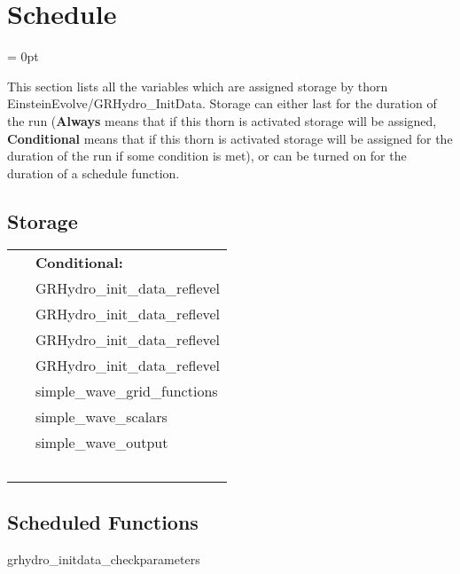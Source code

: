 
\section{Schedule} 


\parskip = 0pt


\noindent This section lists all the variables which are assigned storage by thorn EinsteinEvolve/GRHydro\_InitData.  Storage can either last for the duration of the run ({\bf Always} means that if this thorn is activated storage will be assigned, {\bf Conditional} means that if this thorn is activated storage will be assigned for the duration of the run if some condition is met), or can be turned on for the duration of a schedule function.


\subsection*{Storage}

\hspace{5mm}

 \begin{tabular*}{160mm}{ll} 
~& {\bf Conditional:} \\ 
~ &  GRHydro\_init\_data\_reflevel\\ 
~ &  GRHydro\_init\_data\_reflevel\\ 
~ &  GRHydro\_init\_data\_reflevel\\ 
~ &  GRHydro\_init\_data\_reflevel\\ 
~ &  simple\_wave\_grid\_functions\\ 
~ &  simple\_wave\_scalars\\ 
~ &  simple\_wave\_output\\ 
~ & ~\\ 
\end{tabular*} 


\subsection*{Scheduled Functions}
\vspace{5mm}


\hspace{5mm} grhydro\_initdata\_checkparameters 

\hspace{5mm}{\it check parameters } 


\hspace{5mm}

